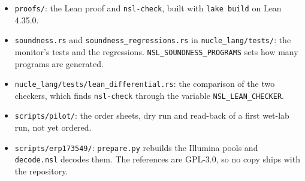 \documentclass[11pt,a4paper]{article}
\begin{document}
\begin{itemize}[leftmargin=*,itemsep=1pt]
\item \texttt{proofs/}: the Lean proof and \texttt{nsl-check}, built with
  \texttt{lake build} on Lean 4.35.0.
\item \texttt{soundness.rs} and \texttt{soundness\_regressions.rs} in
  \texttt{nucle\_lang/tests/}: the monitor's tests and the regressions.
  \texttt{NSL\_SOUNDNESS\_PROGRAMS} sets how many programs are generated.
\item \texttt{nucle\_lang/tests/lean\_differential.rs}: the comparison of
  the two checkers, which finds \texttt{nsl-check} through the variable
  \texttt{NSL\_LEAN\_CHECKER}.
\item \texttt{scripts/pilot/}: the order sheets, dry run and read-back of
  a first wet-lab run, not yet ordered.
\item \texttt{scripts/erp173549/}: \texttt{prepare.py} rebuilds the
  Illumina pools and \texttt{decode.nsl} decodes them. The references are
  GPL-3.0, so no copy ships with the repository.
\end{itemize}
\end{document}
